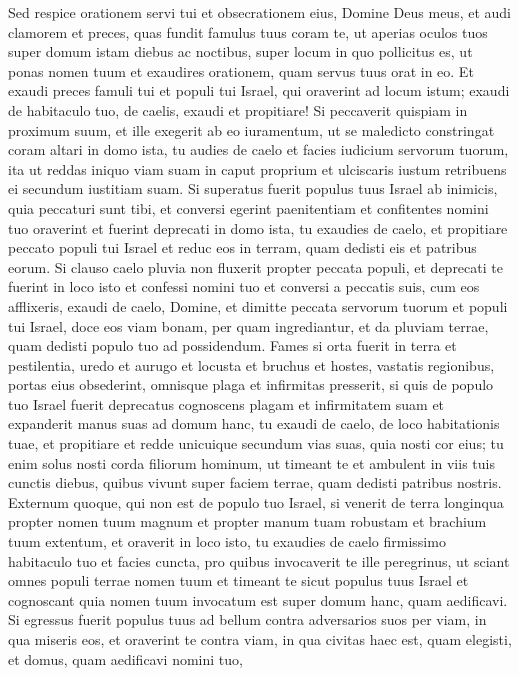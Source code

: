 \begin{biblechapter}
\verse Sed respice orationem servi tui et obsecrationem eius, Domine Deus meus, et audi clamorem et preces, quas fundit famulus tuus coram te, 
\verse ut aperias oculos tuos super domum istam diebus ac noctibus, super locum in quo pollicitus es, ut ponas nomen tuum et exaudires orationem, quam servus tuus orat in eo.  
\verse Et exaudi preces famuli tui et populi tui Israel, qui oraverint ad locum istum; exaudi de habitaculo tuo, de caelis, exaudi et propitiare! 
\verse Si peccaverit quispiam in proximum suum, et ille exegerit ab eo iuramentum, ut se maledicto constringat coram altari in domo ista, 
\verse tu audies de caelo et facies iudicium servorum tuorum, ita ut reddas iniquo viam suam in caput proprium et ulciscaris iustum retribuens ei secundum iustitiam suam. 
\verse Si superatus fuerit populus tuus Israel ab inimicis, quia peccaturi sunt tibi, et conversi egerint paenitentiam et confitentes nomini tuo oraverint et fuerint deprecati in domo ista, 
\verse tu exaudies de caelo, et propitiare peccato populi tui Israel et reduc eos in terram, quam dedisti eis et patribus eorum. 
\verse Si clauso caelo pluvia non fluxerit propter peccata populi, et deprecati te fuerint in loco isto et confessi nomini tuo et conversi a peccatis suis, cum eos afflixeris, 
\verse exaudi de caelo, Domine, et dimitte peccata servorum tuorum et populi tui Israel, doce eos viam bonam, per quam ingrediantur, et da pluviam terrae, quam dedisti populo tuo ad possidendum. 
\verse Fames si orta fuerit in terra et pestilentia, uredo et aurugo et locusta et bruchus et hostes, vastatis regionibus, portas eius obsederint, omnisque plaga et infirmitas presserit, 
\verse si quis de populo tuo Israel fuerit deprecatus cognoscens plagam et infirmitatem suam et expanderit manus suas ad domum hanc, 
\verse tu exaudi de caelo, de loco habitationis tuae, et propitiare et redde unicuique secundum vias suas, quia nosti cor eius; tu enim solus nosti corda filiorum hominum, 
\verse ut timeant te et ambulent in viis tuis cunctis diebus, quibus vivunt super faciem terrae, quam dedisti patribus nostris. 
\verse Externum quoque, qui non est de populo tuo Israel, si venerit de terra longinqua propter nomen tuum magnum et propter manum tuam robustam et brachium tuum extentum, et oraverit in loco isto, 
\verse tu exaudies de caelo firmissimo habitaculo tuo et facies cuncta, pro quibus invocaverit te ille peregrinus, ut sciant omnes populi terrae nomen tuum et timeant te sicut populus tuus Israel et cognoscant quia nomen tuum invocatum est super domum hanc, quam aedificavi. 
\verse Si egressus fuerit populus tuus ad bellum contra adversarios suos per viam, in qua miseris eos, et oraverint te contra viam, in qua civitas haec est, quam elegisti, et domus, quam aedificavi nomini tuo, 

\end{biblechapter}
